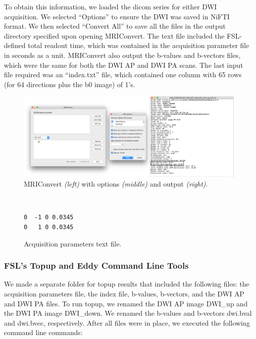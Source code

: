 To obtain this information, we loaded the dicom series for either DWI acquisition. We selected ``Options'' to ensure the DWI was saved in NiFTI format. We then selected ``Convert All'' to save all the files in the output directory specified upon opening MRIConvert. The text file included the FSL-defined total readout time, which was contained in the acquisition parameter file in seconds as a unit. MRIConvert also output the b-values and b-vectors files, which were the same for both the DWI AP and DWI PA scans. The last input file required was an ``index.txt'' file, which contained one column with 65 rows (for 64 directions plus the b0 image) of 1's.

\begin{figure}[H]
    \centering
    \includegraphics[width=\textwidth]{Figures/combined}
    \caption{MRIConvert \textit{(left)} with options \textit{(middle)} and output \textit{(right)}.}
    \label{fig:mri_convert}
\end{figure}

\begin{figure}[H]
\centering
{\tt
\begin{varwidth}{\linewidth}
\begin{verbatim}
0  -1 0 0.0345
0   1 0 0.0345
\end{verbatim}
\end{varwidth}
}
\label{fig:acq}
\caption{Acquisition parameters text file.}
\end{figure}

\subsubsection{FSL's Topup and Eddy Command Line Tools}

We made a separate folder for topup results that included the following files: the acquisition parameters file, the index file, b-values, b-vectors, and the DWI AP and DWI PA files. To run topup, we renamed the DWI AP image DWI\_up and the DWI PA image DWI\_down. We renamed the b-values and b-vectors dwi.bval and dwi.bvec, respectively. After all files were in place, we executed the following command line commands:

